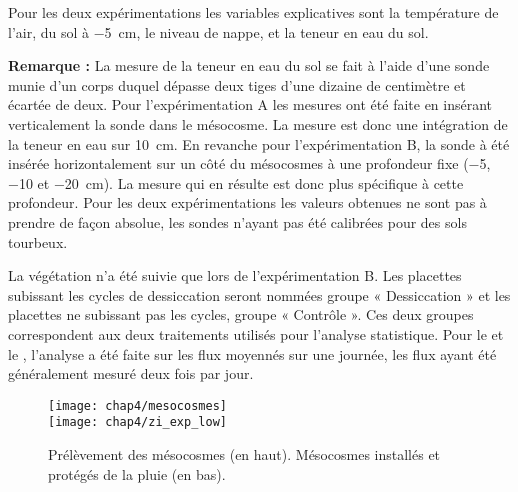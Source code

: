Pour les deux expérimentations les variables explicatives sont la température de l'air, du sol à \SI{-5}{\centi\metre}, le niveau de nappe, et la teneur en eau du sol. 
\begin{center}
\begin{minipage}{.85\textwidth}
\setlength{\parindent}{-10pt}%
\onehalfspacing
\textbf{Remarque :} La mesure de la teneur en eau du sol se fait à l'aide d'une sonde munie d'un corps duquel dépasse deux tiges d'une dizaine de centimètre et écartée de deux. 
Pour l'expérimentation A les mesures ont été faite en insérant verticalement la sonde dans le mésocosme.
La mesure est donc une intégration de la teneur en eau sur \SI{10}{\centi\metre}.
En revanche pour l'expérimentation B, la sonde à été insérée horizontalement sur un côté du mésocosmes à une profondeur fixe (\num{-5}, \num{-10} et \SI{-20}{\centi\metre}).
La mesure qui en résulte est donc plus spécifique à cette profondeur.
Pour les deux expérimentations les valeurs obtenues ne sont pas à prendre de façon absolue, les sondes n'ayant pas été calibrées pour des sols tourbeux.
\end{minipage}
\end{center}
La végétation n'a été suivie que lors de l'expérimentation B.
Les placettes subissant les cycles de dessiccation seront nommées groupe « Dessiccation » et les placettes ne subissant pas les cycles, groupe « Contrôle ».
Ces deux groupes correspondent aux deux traitements utilisés pour l'analyse statistique.
Pour le \coo et le \chh, l'analyse a été faite sur les flux moyennés sur une journée, les flux ayant été généralement mesuré deux fois par jour.

\begin{figure}
\centering
\texttt{[image: chap4/mesocosmes]}\\
\texttt{[image: chap4/zi\_exp\_low]}
\caption{Prélèvement des mésocosmes (en haut). Mésocosmes installés et protégés de la pluie (en bas).}
\label{fig:mesophoto}
\end{figure}





